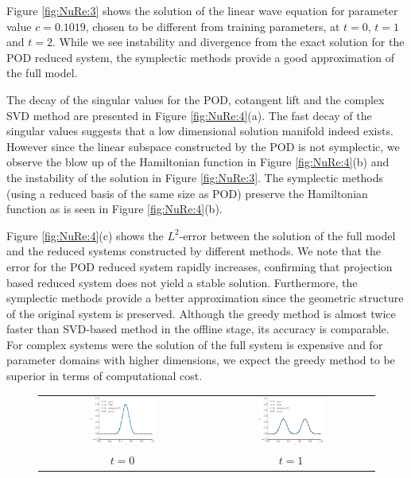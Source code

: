 Figure \ref{fig:NuRe:3} shows the solution of the linear wave equation for parameter value $c=0.1019$, chosen to be different from training parameters, at $t=0$, $t = 1$ and $t=2$. While we see instability and divergence from the exact solution for the POD reduced system, the symplectic methods provide a good approximation of the full model. 

The decay of the singular values for the POD, cotangent lift and the complex SVD method are presented in Figure \ref{fig:NuRe:4}(a). The fast decay of the singular values suggests that a low dimensional solution manifold indeed exists. However since the linear subspace constructed by the POD is not symplectic, we observe the blow up of the Hamiltonian function in Figure \ref{fig:NuRe:4}(b) and the instability of the solution in Figure \ref{fig:NuRe:3}. The symplectic methods (using a reduced basis of the same size as POD) preserve the Hamiltonian function as is seen in Figure \ref{fig:NuRe:4}(b).

Figure \ref{fig:NuRe:4}(c) shows the $L^2$-error between the solution of the full model and the reduced systems constructed by different methods. We note that the error for the POD reduced system rapidly increases, confirming that projection based reduced system does not yield a stable solution. Furthermore, the symplectic methods provide a better approximation since the geometric structure of the original system is preserved. Although the greedy method is almost twice faster than SVD-based method in the offline stage, its accuracy is comparable. For complex systems were the solution of the full system is expensive and for parameter domains with higher dimensions, we expect the greedy method to be superior in terms of computational cost.


\begin{figure}[t]
\begin{center}
\begin{tabular}{cc}
	\includegraphics[width=0.4\textwidth]{./figs/wave/solution/solution_t0} &
	\includegraphics[width=0.4\textwidth]{./figs/wave/solution/solution_t1} \\
	$t=0$ & $t = 1$
\end{tabular}
\end{center}
\end{figure}


